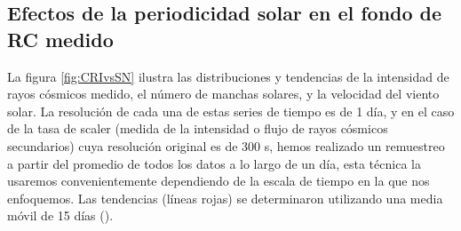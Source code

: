 \subsection{Efectos de la periodicidad solar en el fondo de RC medido}


La figura \ref{fig:CRIvsSN} ilustra  las distribuciones y tendencias de la intensidad de rayos cósmicos medido, el número de manchas solares, y la velocidad del viento solar. La resolución de cada una de estas series de tiempo es de 1 día, y en el caso de la tasa de scaler (medida de la intensidad o flujo de rayos cósmicos secundarios) cuya resolución original es de 300 s, hemos realizado un remuestreo a partir del promedio de todos los datos a lo largo de un día, esta técnica la usaremos convenientemente dependiendo de la escala de tiempo en la que nos enfoquemos. Las tendencias (líneas rojas) se determinaron utilizando una media móvil de 15 días (\cite{Oloketuyi_2020}). 

